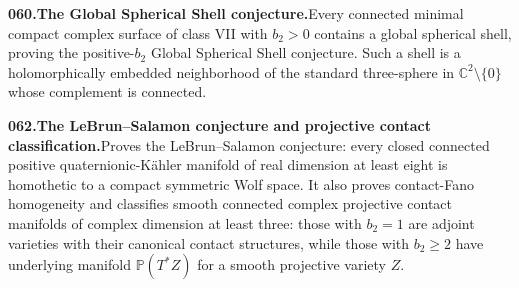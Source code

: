 \documentclass[11pt,a4paper]{article}
\begin{document}
  \par \begin{minipage}{\linewidth}
  \fontsize{10.5}{12.6}\selectfont\RaggedRight
  \hypertarget{result 060}{}
  {\bfseries\textcolor{muted}{060.}\enspace The Global Spherical Shell conjecture.}\enspace Every connected minimal compact complex surface of class VII with $b_2>0$ contains a global spherical shell, proving the positive-$b_2$ Global Spherical Shell conjecture. Such a shell is a holomorphically embedded neighborhood of the standard three-sphere in $\mathbb C^2\setminus\{0\}$ whose complement is connected.\par
  \end{minipage}\par\vspace{5pt}



  \par \begin{minipage}{\linewidth}
  \fontsize{10.5}{12.6}\selectfont\RaggedRight
  \hypertarget{result 062}{}
  {\bfseries\textcolor{muted}{062.}\enspace The LeBrun--Salamon conjecture and projective contact classification.}\enspace Proves the LeBrun--Salamon conjecture: every closed connected positive quaternionic-K\"ahler manifold of real dimension at least eight is homothetic to a compact symmetric Wolf space. It also proves contact-Fano homogeneity and classifies smooth connected complex projective contact manifolds of complex dimension at least three: those with $b_2=1$ are adjoint varieties with their canonical contact structures, while those with $b_2\ge2$ have underlying manifold $\mathbb P(T^*Z)$ for a smooth projective variety $Z$.\par
  \end{minipage}\par\vspace{5pt}
\end{document}

